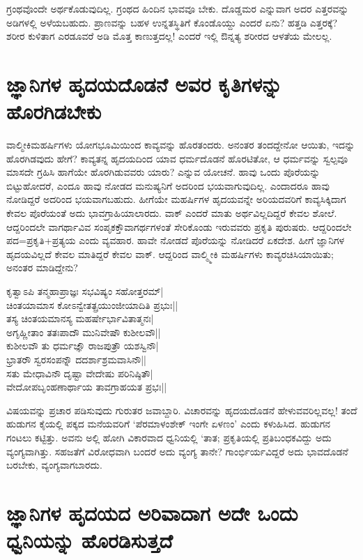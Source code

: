 ಗ್ರಂಥವೊಂದೇ ಅರ್ಥಕೊಡುವುದಿಲ್ಲ. ಗ್ರಂಥದ ಹಿಂದಿನ ಭಾವವೂ ಬೇಕು. ದೊಡ್ಡಮರ ಎನ್ನುವಾಗ ಅದರ ಎತ್ತರವನ್ನು ಅಡಿಗಳಲ್ಲಿ ಅಳೆಯಬಹುದು. ಪ್ರಾಣವನ್ನು ಬಹಳ ಉನ್ನತಸ್ಥಿತಿಗೆ ಕೊಂಡೊಯ್ದು ಎಂದರೆ ಏನು? ಹತ್ತಡಿ ಎತ್ತರಕ್ಕೆ? ಶರೀರ ಕುಳಿತಾಗ ಎರಡೂವರೆ ಅಡಿ ಮೊತ್ತ ಕಾಣುತ್ತದಲ್ಲ! ಎಂದರೆ ಇಲ್ಲಿ ಔನ್ನತ್ಯ ಶರೀರದ ಆಳತೆಯ ಮೇಲಲ್ಲ. 

\section*{ಜ್ಞಾನಿಗಳ ಹೃದಯದೊಡನೆ ಅವರ ಕೃತಿಗಳನ್ನು ಹೊರಗಿಡಬೇಕು}

ವಾಲ್ಮೀಕಿಮಹರ್ಷಿಗಳು ಯೋಗಭೂಮಿಯಿಂದ ಕಾವ್ಯವನ್ನು ಹೊರತಂದರು. ಅನಂತರ ತಂದದ್ದೇನೋ ಆಯಿತು, ಇದನ್ನು ಹೊರಗಿಡವುದು ಹೇಗೆ? ಕಾವ್ಯತನ್ನ ಹೃದಯದಿಂದ ಯಾವ ಧರ್ಮದೊಡನೆ ಹೊರಟಿತೋ, ಆ ಧರ್ಮವನ್ನು ಸ್ವಲ್ಪವೂ ಮಾಸದೇ ಗ್ರಹಿಸಿ ಹಾಗೆಯೇ ಹೊರಗಿಡುವವರು ಯಾರು? ಎನ್ನುವ ಯೋಚನೆ. ಹಾವು ಒಂದು ಪೊರೆಯನ್ನು ಬಿಟ್ಟುಹೋದರೆ, ಎಂದೂ ಹಾವು ನೋಡದ ಮನುಷ್ಯನಿಗೆ ಅದರಿಂದ ಭಯವಾಗುವುದಿಲ್ಲ. ಎಂದಾದರೂ ಹಾವು ನೋಡಿದ್ದರೆ ಅದರಿಂದ ಭಯವಾಗಬಹುದು. ಹೀಗೆಯೇ ಮಹರ್ಷಿಗಳ ಹೃದಯವನ್ನೇ ಅರಿಯದವರಿಗೆ ಕಾವ್ಯಸಿಕ್ಕಿದಾಗ ಕೇವಲ ಪೊರೆಯಂತೆ ಅದು ಭಾವಗ್ರಾಹಿಯಾಲಾರದು. ವಾಕ್ ಎಂದರೆ ಮಾತು ಅರ್ಥವಿಲ್ಲದಿದ್ದರೆ ಕೇವಲ ಶೋಲೆ. ಆದ್ದರಿಂದಲೇ ವಾಗರ್ಥಾವಿವ ಸಂಪೃಕಕ್ತೌವಾಗರ್ಥಗಳಂತೆ ಸೇರಿಕೊಂಡು ಇರುವವರು ಪ್ರಕೃತಿ ಪುರುಷರು. ಆದ್ದರಿಂದಲೇ ಪದ=ಪ್ರಕೃತಿ+ಪ್ರತ್ಯಯ ಎಂದು ವ್ಯವಹಾರ. ಹಾವೇ ನೋಡದೆ ಪೊರೆಯನ್ನು ನೋಡಿದರೆ ಏಕದೇಶ. ಹೀಗೆ ಜ್ಞಾನಿಗಳ ಹೃದಯವಿಲ್ಲದೆ ಕೇವಲ ಮಾತಿದ್ದರೆ ಕೇವಲ ವಾಕ್. ಆದ್ದರಿಂದ ವಾಲ್ಮ್ಮೀಕಿ ಮಹರ್ಷಿಗಳು ಕಾವ್ಯರಚಿಸಿಯಾಯಿತು; ಅನಂತರ ಮಾಡಿದ್ದೇನು? 

\begin{shloka}
ಕೃತ್ವಾಽಪಿ ತನ್ಮಹಾಪ್ರಾಜ್ಞಃ ಸಭವಿಷ್ಯಂ ಸಹೋತ್ತರಮ್|\\
ಚಿಂತಯಾಮಾಸ ಕೋಽನ್ವೇತತ್ಪ್ರಯುಂಜೀಯಾದಿತಿ ಪ್ರಭುಃ||\\
ತಸ್ಯ ಚಿಂತಯಮಾನಸ್ಯ ಮಹರ್ಷೇರ್ಭಾವಿತಾತ್ಮನಃ|\\
ಅಗೃಹ್ಣೀತಾಂ ತತಃಪಾದೌ ಮುನಿವೇಷೌ ಕುಶೀಲವೌ||\\
ಕುಶೀಲವೌ ತು ಧರ್ಮಜ್ಞೌ ರಾಜಪುತ್ರೌ ಯಶಸ್ವಿನೌ|\\
ಭ್ರಾತರೌ ಸ್ವರಸಂಪನ್ನೌ ದದರ್ಶಾಶ್ರಮವಾಸಿನೌ||\\
ಸತು ಮೇಧಾವಿನೌ ದೃಷ್ಟಾ ವೇದೇಷು ಪರಿನಿಷ್ಠಿತೌ|\\
ವೇದೋಪಬೃಂಹಣಾರ್ಥಾಯ ತಾವಗ್ರಾಹಯತ ಪ್ರಭಃ||
\end{shloka}

ವಿಷಯವನ್ನು ಪ್ರಚಾರ ಪಡಿಸುವುದು ಗುರುತರ ಜವಾಬ್ದಾರಿ. ವಿಚಾರವನ್ನು ಹೃದಯದೊಡನೆ ಹೇಳುವವರಿಲ್ಲವಲ್ಲ! ತಂದೆ ಹುಡುಗನ ಕೈಯಲ್ಲಿ ಪಕ್ಕದ ಮನೆಯವರಿಗೆ `ಪೆರಮಾಳಂಶೇಕ್ ಇಂಗೇ ಏಳಣಂ' ಎಂದು ಕಳುಹಿಸಿದ. ಹುಡುಗನ ಗಂಟಲು ಕಟ್ಟಿತ್ತು. ಅವನು ಅಲ್ಲಿ ಹೋಗಿ ವಿಕಾರವಾದ ಧ್ವನಿಯಲ್ಲಿ `ತಾತ; ಪ್ರಕೃತಿಯಲ್ಲಿ ಪ್ರತಿಬಂಧಕವಿದ್ದು ಅದು ವ್ಯಂಗ್ಯವಾಗಿತ್ತು. ಸಹಜತೆಗೆ ವಿರೋಧವಾಗಿ ಬಂದರೆ ಅದು ವ್ಯಂಗ್ಯ ತಾನೇ? ಗಾಂರ್ಭಿರ್ಯವಿದ್ದರೆ ಅದು ಭಾವದೊಡನೆ ಬರಬೇಕು, ವ್ಯಂಗ್ಯವಾಗಬಾರದು.

\section*{ಜ್ಞಾನಿಗಳ ಹೃದಯದ ಅರಿವಾದಾಗ ಅದೇ ಒಂದು ಧ್ವನಿಯನ್ನು  ಹೊರಡಿಸುತ್ತದೆ}

